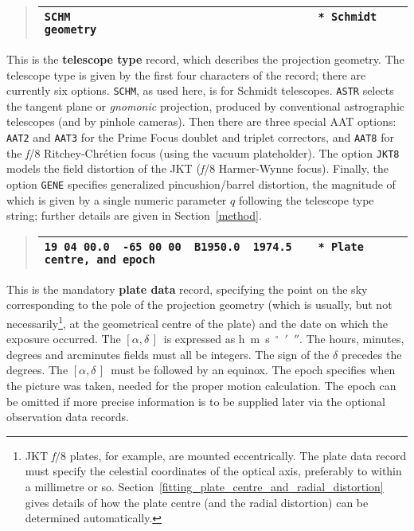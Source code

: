 \documentclass[twoside,11pt]{article}
\renewcommand{\_}{\texttt{\symbol{95}}}
\newcommand{\radec}     {$[\alpha,\delta\,]$}
\begin{document}
\goodbreak
\begin{quote}
\begin{tabular}{|l|}
\hline
\verb|SCHM                                      * Schmidt geometry| \\
\hline
\end{tabular}
\end{quote}

This is the \textbf{telescope type} record, which describes the projection
geometry.  The telescope type is given by the first four characters of
the record;  there are currently six options.  \texttt{SCHM}, as used
here, is for Schmidt telescopes.  \texttt{ASTR} selects the tangent
plane or \textit{gnomonic} projection, produced by conventional
astrographic telescopes (and by pinhole cameras).  Then there are
three special AAT options: \texttt{AAT2} and \texttt{AAT3} for the
Prime Focus doublet and triplet correctors, and \texttt{AAT8} for the
\textit{f}/8 Ritchey-Chr\'etien focus (using the vacuum plateholder).
The option \texttt{JKT8} models the field distortion of the JKT
(\textit{f}/8 Harmer-Wynne focus).  Finally, the option \texttt{GENE}
specifies generalized pincushion/barrel distortion, the magnitude of
which is given by a single numeric parameter $q$ following the telescope
type string; further details are given in Section~\ref{method}.

\goodbreak
\begin{quote}
\begin{tabular}{|l|}
\hline
\verb|19 04 00.0  -65 00 00  B1950.0  1974.5    * Plate centre, and epoch| 
\\
\hline
\end{tabular}
\end{quote}

This is the mandatory \textbf{plate data} record, specifying the
point on the sky corresponding to the pole of the projection
geometry (which is usually, but not necessarily\footnote{JKT
\textit{f}/8 plates, for example, are mounted eccentrically.
The plate data record must specify the celestial coordinates
of the optical axis, preferably to within a millimetre or so.
Section~\ref{fitting_plate_centre_and_radial_distortion} gives details
of how the plate centre (and the radial distortion) can be determined
automatically.}, at the geometrical centre of the plate) and the
date on which the exposure occurred.  The \radec\ is expressed as
h~m~s~$^\circ$~$'$~$''$.  The hours, minutes, degrees and arcminutes
fields must all be integers.  The sign of the $\delta$ precedes the
degrees.  The \radec\ must be followed by an equinox.  The epoch specifies
when the picture was taken, needed for the proper motion calculation.
The epoch can be omitted if more precise information is to be supplied
later via the optional observation data records.
\end{document}

